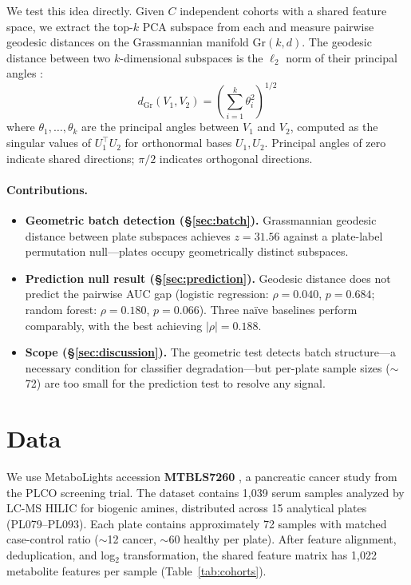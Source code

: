 \documentclass{article}
\begin{document}
We test this idea directly. Given $C$ independent cohorts with a shared feature space, we extract the top-$k$ PCA subspace from each and measure pairwise geodesic distances on the Grassmannian manifold $\mathrm{Gr}(k, d)$. The geodesic distance between two $k$-dimensional subspaces is the $\ell_2$ norm of their principal angles \citep{bjorck1973numerical, ye2016schubert}:
\begin{equation}
d_{\mathrm{Gr}}(V_1, V_2) = \left(\sum_{i=1}^{k} \theta_i^2\right)^{1/2}
\end{equation}
where $\theta_1, \ldots, \theta_k$ are the principal angles between $V_1$ and $V_2$, computed as the singular values of $U_1^\top U_2$ for orthonormal bases $U_1, U_2$. Principal angles of zero indicate shared directions; $\pi/2$ indicates orthogonal directions.

\paragraph{Contributions.}
\begin{itemize}
\item \textbf{Geometric batch detection (\S\ref{sec:batch}).} Grassmannian geodesic distance between plate subspaces achieves $z = 31.56$ against a plate-label permutation null---plates occupy geometrically distinct subspaces.
\item \textbf{Prediction null result (\S\ref{sec:prediction}).} Geodesic distance does not predict the pairwise AUC gap (logistic regression: $\rho = 0.040$, $p = 0.684$; random forest: $\rho = 0.180$, $p = 0.066$). Three na\"{i}ve baselines perform comparably, with the best achieving $|\rho| = 0.188$.
\item \textbf{Scope (\S\ref{sec:discussion}).} The geometric test detects batch structure---a necessary condition for classifier degradation---but per-plate sample sizes ($\sim$72) are too small for the prediction test to resolve any signal.
\end{itemize}


\section{Data}

We use MetaboLights accession \textbf{MTBLS7260} \citep{leonletelier2024contributions}, a pancreatic cancer study from the PLCO screening trial. The dataset contains 1{,}039 serum samples analyzed by LC-MS HILIC for biogenic amines, distributed across 15 analytical plates (PL079--PL093). Each plate contains approximately 72 samples with matched case-control ratio ($\sim$12 cancer, $\sim$60 healthy per plate). After feature alignment, deduplication, and log$_2$ transformation, the shared feature matrix has 1{,}022 metabolite features per sample (Table~\ref{tab:cohorts}).
\end{document}
